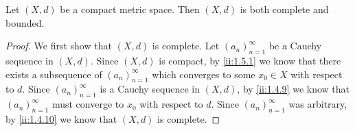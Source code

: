 \begin{prop}\label{ii:1.5.5}
  Let \((X, d)\) be a compact metric space.
  Then \((X, d)\) is both complete and bounded.
\end{prop}

\begin{proof}
  We first show that \((X, d)\) is complete.
  Let \((a_n)_{n = 1}^\infty\) be a Cauchy sequence in \((X, d)\).
  Since \((X, d)\) is compact, by \cref{ii:1.5.1} we know that there exists a subsequence of \((a_n)_{n = 1}^\infty\) which converges to some \(x_0 \in X\) with respect to \(d\).
  Since \((a_n)_{n = 1}^\infty\) is a Cauchy sequence in \((X, d)\), by \cref{ii:1.4.9} we know that \((a_n)_{n = 1}^\infty\) must converge to \(x_0\) with respect to \(d\).
  Since \((a_n)_{n = 1}^\infty\) was arbitrary, by \cref{ii:1.4.10} we know that \((X, d)\) is complete.


\end{proof}
